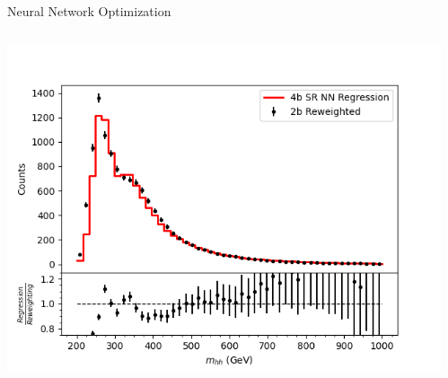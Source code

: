 \documentclass[10pt, aspectratio=169]{beamer}
\begin{document}
\begin{frame}{Neural Network Optimization}
\begin{columns}[onlytextwidth]
\begin{column}{0.4\textwidth}
      \hspace{0.3cm}\includegraphics[width=0.9\linewidth]{images/model_2b4b_10505050_30e_25x25_poisson_50mhh_mhhSR.png}\\
    \end{column}
​  \end{columns}
\end{frame}
\end{document}
